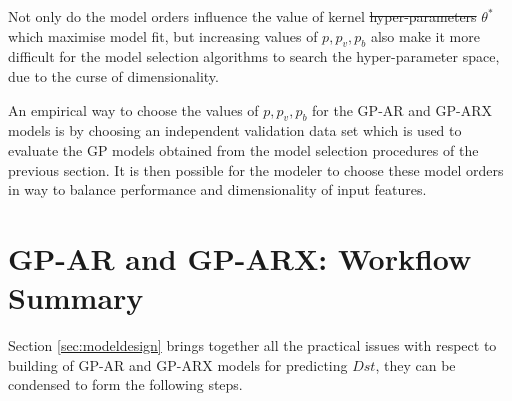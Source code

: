 \documentclass{article}
\providecommand{\DIFadd}[1]{{\protect\color{blue}\uwave{#1}}} %
\providecommand{\DIFdel}[1]{{\protect\color{red}\sout{#1}}}                      %
\providecommand{\DIFaddbegin}{} %
\providecommand{\DIFaddend}{} %
\providecommand{\DIFdelbegin}{} %
\providecommand{\DIFdelend}{} %
\newcommand{\DIFscaledelfig}{0.5}
\newlength{\DIFdelgraphicswidth} %
\newlength{\DIFdelgraphicsheight} %
\newcommand{\DIFaddincludegraphics}[2][]{{\color{blue}\fbox{\DIFOincludegraphics[#1]{#2}}}} %
\newcommand{\DIFdelincludegraphics}[2][]{%
\sbox{\DIFdelgraphicsbox}{\DIFOincludegraphics[#1]{#2}}%
\settoboxwidth{\DIFdelgraphicswidth}{\DIFdelgraphicsbox} %
\settoboxtotalheight{\DIFdelgraphicsheight}{\DIFdelgraphicsbox} %
\scalebox{\DIFscaledelfig}{%
\parbox[b]{\DIFdelgraphicswidth}{\usebox{\DIFdelgraphicsbox}\\[-\baselineskip] \rule{\DIFdelgraphicswidth}{0em}}\llap{\resizebox{\DIFdelgraphicswidth}{\DIFdelgraphicsheight}{%
\setlength{\unitlength}{\DIFdelgraphicswidth}%
\begin{picture}(1,1)%
\thicklines\linethickness{2pt} %
{\color[rgb]{1,0,0}\put(0,0){\framebox(1,1){}}}%
{\color[rgb]{1,0,0}\put(0,0){\line( 1,1){1}}}%
{\color[rgb]{1,0,0}\put(0,1){\line(1,-1){1}}}%
\end{picture}%
}\hspace*{3pt}}} %
} %
\DeclareRobustCommand{\DIFaddbegin}{\DIFOaddbegin \let\includegraphics\DIFaddincludegraphics} %
\DeclareRobustCommand{\DIFaddend}{\DIFOaddend \let\includegraphics\DIFOincludegraphics} %
\DeclareRobustCommand{\DIFdelbegin}{\DIFOdelbegin \let\includegraphics\DIFdelincludegraphics} %
\DeclareRobustCommand{\DIFdelend}{\DIFOaddend \let\includegraphics\DIFOincludegraphics} %
\begin{document}
Not only do the model orders influence the value of kernel \DIFdelbegin \DIFdel{hyper-parameters }\DIFdelend \DIFaddbegin \DIFadd{hyperparameters }\DIFaddend $\theta^*$ which maximise model fit, but increasing values of $p, p_v, p_b$ also make it more difficult for the model selection algorithms to search the hyper-parameter space, due to the curse of dimensionality.

An empirical way to choose the values of $p, p_v, p_b$ for the GP-AR and GP-ARX models is by choosing an independent validation data set which is used to evaluate the GP models obtained from the model selection procedures of the previous section. It is then possible for the modeler to choose these model orders in way to balance performance and dimensionality of input features.

\section{GP-AR and GP-ARX: Workflow Summary}\label{sec:workflow}

Section \ref{sec:modeldesign} brings together all the practical issues with respect to building of GP-AR and GP-ARX models for predicting $Dst$, they can be condensed to form the following steps.
\end{document}
